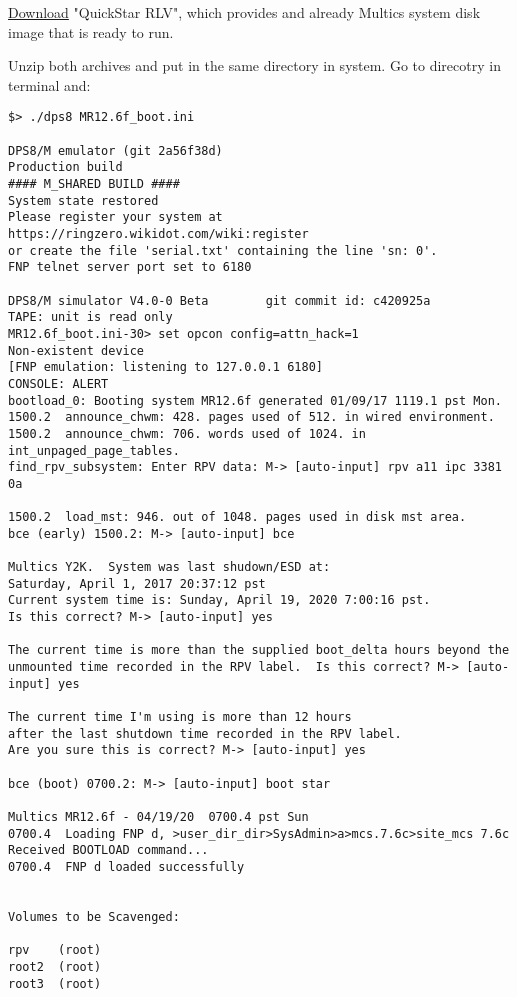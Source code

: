 \href{https://s3.amazonaws.com/eswenson-multics/public/releases/MR12.6f/QuickStart_MR12.6f.zip}{Download} "QuickStar RLV", 
which provides and already Multics system disk image that is ready to run.


Unzip both archives and put in the same directory in system. Go to direcotry in terminal and:
\begin{lstlisting}
$> ./dps8 MR12.6f_boot.ini 

DPS8/M emulator (git 2a56f38d)
Production build
#### M_SHARED BUILD ####
System state restored
Please register your system at https://ringzero.wikidot.com/wiki:register
or create the file 'serial.txt' containing the line 'sn: 0'.
FNP telnet server port set to 6180

DPS8/M simulator V4.0-0 Beta        git commit id: c420925a
TAPE: unit is read only
MR12.6f_boot.ini-30> set opcon config=attn_hack=1
Non-existent device
[FNP emulation: listening to 127.0.0.1 6180]
CONSOLE: ALERT
bootload_0: Booting system MR12.6f generated 01/09/17 1119.1 pst Mon.   
1500.2  announce_chwm: 428. pages used of 512. in wired environment.
1500.2  announce_chwm: 706. words used of 1024. in int_unpaged_page_tables.
find_rpv_subsystem: Enter RPV data: M-> [auto-input] rpv a11 ipc 3381 0a

1500.2  load_mst: 946. out of 1048. pages used in disk mst area.
bce (early) 1500.2: M-> [auto-input] bce

Multics Y2K.  System was last shudown/ESD at:
Saturday, April 1, 2017 20:37:12 pst
Current system time is: Sunday, April 19, 2020 7:00:16 pst.
Is this correct? M-> [auto-input] yes

The current time is more than the supplied boot_delta hours beyond the
unmounted time recorded in the RPV label.  Is this correct? M-> [auto-input] yes

The current time I'm using is more than 12 hours
after the last shutdown time recorded in the RPV label.
Are you sure this is correct? M-> [auto-input] yes

bce (boot) 0700.2: M-> [auto-input] boot star

Multics MR12.6f - 04/19/20  0700.4 pst Sun
0700.4  Loading FNP d, >user_dir_dir>SysAdmin>a>mcs.7.6c>site_mcs 7.6c
Received BOOTLOAD command...
0700.4  FNP d loaded successfully


Volumes to be Scavenged:

rpv    (root)
root2  (root)
root3  (root)


\end{lstlisting}
